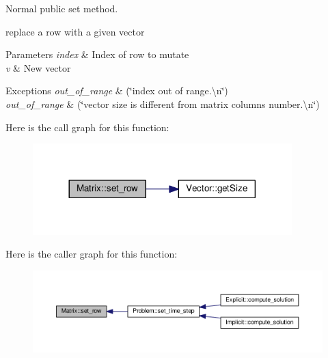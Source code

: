 Normal public set method. 

replace a row with a given vector 
\begin{DoxyParams}{Parameters}
{\em index} & Index of row to mutate \\
\hline
{\em v} & New vector \\
\hline
\end{DoxyParams}

\begin{DoxyExceptions}{Exceptions}
{\em out\+\_\+of\+\_\+range} & (\char`\"{}index out of range.\textbackslash{}n\char`\"{}) \\
\hline
{\em out\+\_\+of\+\_\+range} & (\char`\"{}vector size is different from matrix columns number.\textbackslash{}n\char`\"{}) \\
\hline
\end{DoxyExceptions}


Here is the call graph for this function\+:
\nopagebreak
\begin{figure}[H]
\begin{center}
\leavevmode
\includegraphics[width=284pt]{classMatrix_a24066c6e9743a07387bcb287437a6cea_cgraph}
\end{center}
\end{figure}




Here is the caller graph for this function\+:
\nopagebreak
\begin{figure}[H]
\begin{center}
\leavevmode
\includegraphics[width=350pt]{classMatrix_a24066c6e9743a07387bcb287437a6cea_icgraph}
\end{center}
\end{figure}


